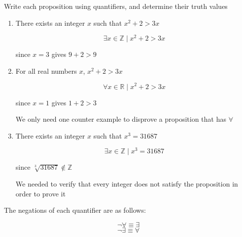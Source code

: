\documentclass[../../Main.tex]{subfiles}
\begin{document}
\begin{example}
    Write each proposition using quantifiers, and determine their truth values
    
    \begin{enumerate}
        \item 
            There exists an integer $x$ such that $x^2 + 2 > 3x$

            \begin{solution}
                $$\exists x \in \mathbb{Z} \mid x^2 + 2 > 3x$$

                \TRUE since $x = 3$ gives $9 + 2 > 9$
            \end{solution}
        

        \item 
            For all real numbers $x$, $x^2 + 2 > 3x$

            \begin{solution}
                $$\forall x \in \mathbb{R} \mid x^2 + 2 > 3x$$

                \FALSE since $x = 1$ gives $1 + 2 > 3$
            \end{solution}

        \begin{note}
            We only need one counter example to disprove a proposition that has $\forall$
        \end{note}

        \item
            There exists an integer $x$ such that $x^3 = 31687$

            \begin{solution}
                $$\exists x \in \mathbb{Z} \mid x^3 = 31687$$            

                \FALSE since $\sqrt[3]{31687} \not \in \mathbb{Z}$
            \end{solution}

        \begin{note}
            We needed to verify that every integer does not satisfy the proposition in order to prove it
        \end{note}
        
    \end{enumerate}
\end{example}

The negations of each quantifier are as follows:

$$\neg \forall \equiv \exists$$
$$\neg \exists \equiv \forall$$
\end{document}
